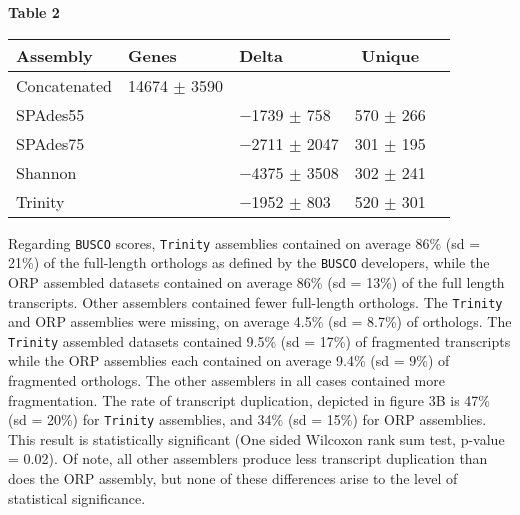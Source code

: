 \documentclass[10pt,letterpaper]{article}
\begin{document}
\newpage
\begin{center}
\textbf{\hypertarget{Table 2}{Table 2}} \\
\begin{tabular}{l l l c c }
\textbf{Assembly} & \textbf{Genes} & \textbf{Delta} & \textbf{Unique}   \\ \hline
Concatenated & 14674 $\pm$ 3590 &  &  \\ \hline
SPAdes55 &  & $-$1739 $\pm$ 758  & 570 $\pm$ 266  \\ \hline
SPAdes75 &  & $-$2711 $\pm$ 2047  & 301 $\pm$ 195  \\ \hline
Shannon &  & $-$4375 $\pm$ 3508  & 302 $\pm$ 241  \\ \hline
Trinity &  & $-$1952 $\pm$ 803  & 520 $\pm$ 301  \\ \hline


\end{tabular}
\end{center}
\begin{quote}
\end{quote}

Regarding \texttt{BUSCO} scores, \texttt{Trinity} assemblies contained on average 86\% (sd = 21\%) of the full-length orthologs as defined by the \texttt{BUSCO} developers, while the ORP assembled datasets contained on average 86\% (sd = 13\%) of the full length transcripts. Other assemblers contained fewer full-length orthologs. The \texttt{Trinity} and ORP assemblies were missing, on average 4.5\% (sd = 8.7\%) of orthologs. The \texttt{Trinity} assembled datasets contained 9.5\% (sd = 17\%) of fragmented transcripts while the ORP assemblies each contained on average 9.4\% (sd = 9\%) of fragmented orthologs. The other assemblers in all cases contained more fragmentation. The rate of transcript duplication, depicted in figure 3B is 47\% (sd = 20\%) for \texttt{Trinity} assemblies, and 34\% (sd = 15\%) for ORP assemblies.  This result is statistically significant (One sided Wilcoxon rank sum test, p-value = 0.02). Of note, all other assemblers produce less transcript duplication than does the ORP assembly, but none of these differences arise to the level of statistical significance. 
\end{document}
